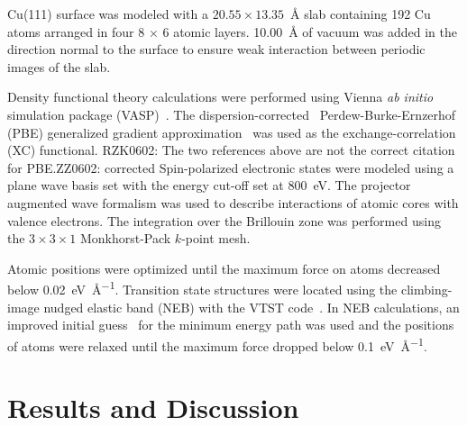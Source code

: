 \documentclass[%
 reprint,
 amsmath,amssymb,
 aps,
prb,
floatfix,
]{revtex4-2}
\newcommand{\lock}{\color{red}}
\newcommand{\zhzh}{\color{blue}}
\newcommand{\lock}{\color{red}}
\newcommand{\zhzh}{\color{blue}}
\newcommand{\comm}{\color{Purple}} %
\begin{document}
{\lock

Cu(111) surface was modeled with a $20.55 \times 13.35$~\si{\angstrom} slab containing 192 Cu atoms arranged in four 8 $\times$ 6 atomic layers. \SI{10.00}{\angstrom} of vacuum was added in the direction normal to the surface to ensure weak interaction between periodic images of the slab.

Density functional theory calculations were performed using Vienna \emph{ab initio} simulation package (VASP)~\cite{ullmann_131, ullmann_132, ullmann_133, ullmann_134}. The dispersion-corrected~\cite{ullmann_136, ullmann_137} Perdew-Burke-Ernzerhof (PBE) generalized gradient approximation~\cite{ullmann_139} was used as the exchange-correlation (XC) functional. {\comm RZK0602: The two references above are not the correct citation for PBE.}{\zhzh ZZ0602: corrected} Spin-polarized electronic states were modeled using a plane wave basis set with the energy cut-off set at \SI{800}{\electronvolt}. The projector augmented wave formalism was used to describe interactions of atomic cores with valence electrons. The integration over the Brillouin zone was performed using the $3\times 3 \times1$ Monkhorst-Pack $k$-point mesh. 

Atomic positions were optimized until the maximum force on atoms decreased below \SI{0.02}{\electronvolt\per\angstrom}. 
Transition state structures were located using the climbing-image nudged elastic band (NEB) with the VTST code~\cite{ullmann_59}. 
In NEB calculations, an improved initial guess~\cite{ullmann_60, ullmann_99} for the minimum energy path was used and the positions of atoms were relaxed until the maximum force dropped below \SI{0.1}{\electronvolt\per\angstrom}.

}

\section{Results and Discussion}
\end{document}
